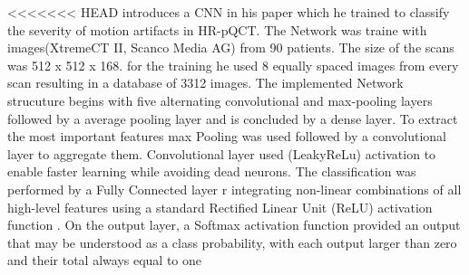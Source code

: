 \documentclass[
a4paper, 
12pt,
grayscalebody, %
abstract=on,
twoside, BCOR10mm, 12pt, DIV13,headinclude, footexclude, final, abstracton, openright
]{ibireprt}
\numberwithin{equation}{chapter}
\numberwithin{table}{chapter}
\numberwithin{figure}{chapter}
\numberwithin{algorithm}{chapter}
\numberwithin{example}{chapter}
\numberwithin{example}{chapter}
\begin{document}
<<<<<<< HEAD
\cite{Walle2023} introduces a CNN in his paper which he trained to classify the severity of motion artifacts in HR-pQCT. The Network was traine with images(XtremeCT II, Scanco Media AG) from 90 patients. The size of the scans was 512 x 512 x 168. for the training he used 8 equally spaced images from every scan  resulting in a database of 3312 images.
The implemented Network strucuture begins with five alternating convolutional and max-pooling layers followed by a average pooling layer and is concluded by a dense layer. To extract the most important features max Pooling was used followed by a convolutional layer to aggregate them. Convolutional layer used (LeakyReLu) activation to enable faster learning while avoiding dead neurons.
 The classification was performed by a Fully Connected layer r integrating non-linear combinations of all high-level features using a standard Rectified Linear
Unit (ReLU) activation function . On the output layer, a Softmax activation function provided an output that may be understood as a class probability, with each output larger than zero and their total always equal to one
\end{document}

